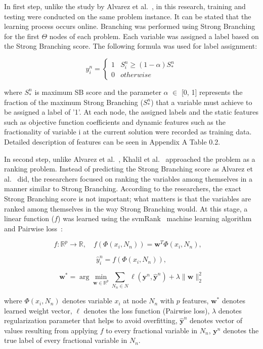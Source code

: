 In first step, unlike the study by Alvarez et al.~\cite{alvarezMachineLearningBasedApproximation2017}, in this research, training and testing were conducted on the same problem instance.
It can be stated that the learning process occurs online.
Branching was performed using Strong Branching for the first $\Theta$ nodes of each problem.
Each variable was assigned a label based on the Strong Branching score.
The following formula was used for label assignment:

\[ y_i^n = \begin{cases}
      1 & S_i^n\geq (1-\alpha)S_*^n \\
      0 & otherwise
   \end{cases}
\]

where $S_*^n$ is maximum SB score and the parameter $\alpha$ $\in$ [0, 1] represents the fraction of the maximum Strong Branching ($S_*^n$) that a variable must achieve to be assigned a label of '1'.
At each node, the assigned labels and the static features such as objective function coefficients and dynamic features such as the fractionality of variable i at the current solution were recorded as training data.
Detailed description of features can be seen in Appendix A Table 0.2. %


In second step, unlike Alvarez et al.~\cite{alvarezMachineLearningBasedApproximation2017}, Khalil et al.~\cite{khalilLearningBranchMixed2016} approached the problem as a ranking problem.
Instead of predicting the Strong Branching score as Alvarez et al.~\cite{alvarezMachineLearningBasedApproximation2017} did, the researchers focused on ranking the variables among themselves in a manner similar to Strong Branching.
According to the researchers, the exact Strong Branching score is not important; what matters is that the variables are ranked among themselves in the way Strong Branching would.
At this stage, a linear function ($f$) was learned using the svmRank~\cite{joachimsTrainingLinearSVMs2006} machine learning algorithm and Pairwise loss~\cite{joachimsOptimizingSearchEngines}:

\[
f: \mathbb{R}^p \rightarrow \mathbb{R}, \quad
f\left(\Phi(x_i, N_n)\right) = \mathbf{w}^T \Phi(x_i, N_n), \quad
\]

\[
\hat{y}_i^n = f\left(\Phi(x_i, N_n)\right),
\]

\[
\mathbf{w}^* = \arg\min_{\mathbf{w} \in \mathbb{R}^p}
\sum_{N_n \in N} \ell(\mathbf{y}^n, \hat{\mathbf{y}}^n)
+ \lambda \| \mathbf{w} \|_2^2
\]

where $\Phi(x_i, N_n)$ denotes variable $x_i$ at node $N_n$ with $p$ features, $\mathbf{w}^*$ denotes learned weight vector, $\ell$ denotes the loss function (Pairwise loss), $\lambda$ denotes regularization parameter that helps to avoid overfitting, $\hat{\mathbf{y}}^n$ denotes vector of values resulting from applying $f$ to every fractional variable in $N_n$, $\mathbf{y}^n$ denotes the true label of every fractional variable in $N_n$.


